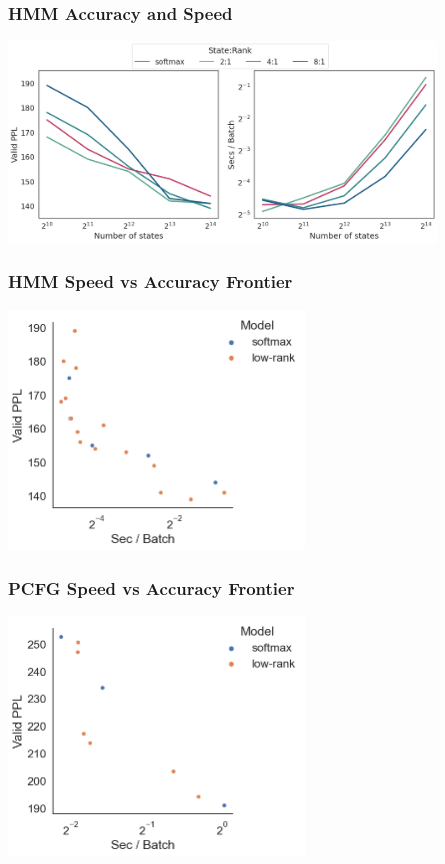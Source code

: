 \documentclass{beamer}
\begin{document}
\begin{frame}
\frametitle{HMM Accuracy and Speed}
\centering
\includegraphics[height=2.1in]{imgs/hmm/lhmm-speed-acc-joint.png}
\end{frame}

\begin{frame}
\frametitle{HMM Speed vs Accuracy Frontier}
\centering
\includegraphics[height=2.5in]{imgs/hmm/lhmm-speed-accuracy.png}
\end{frame}

\begin{frame}
\frametitle{PCFG Speed vs Accuracy Frontier}
\centering
\includegraphics[height=2.5in]{imgs/hmm/pcfg-speed-accuracy.png}
\end{frame}
\end{document}
